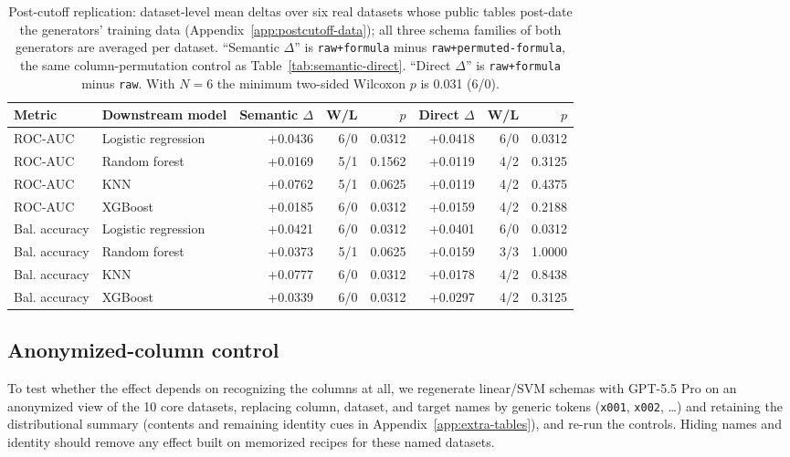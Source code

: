 \begin{table}[tbp]
\caption{Post-cutoff replication: dataset-level mean deltas over six real datasets whose public tables post-date the generators' training data (Appendix~\ref{app:postcutoff-data}); all three schema families of both generators are averaged per dataset. ``Semantic $\Delta$'' is \texttt{raw+formula} minus \texttt{raw+permuted-formula}, the same column-permutation control as Table~\ref{tab:semantic-direct}. ``Direct $\Delta$'' is \texttt{raw+formula} minus \texttt{raw}. With $N = 6$ the minimum two-sided Wilcoxon $p$ is 0.031 (6/0).}\label{tab:postcutoff}
\centering
\small
\begin{adjustbox}{max width=\linewidth}
\begin{tabular}{llrrrrrr}
\toprule
Metric & Downstream model & Semantic \(\Delta\) & W/L & \(p\) & Direct \(\Delta\) & W/L & \(p\) \\
\midrule
ROC-AUC & Logistic regression & +0.0436 & 6/0 & 0.0312 & +0.0418 & 6/0 & 0.0312 \\
ROC-AUC & Random forest & +0.0169 & 5/1 & 0.1562 & +0.0119 & 4/2 & 0.3125 \\
ROC-AUC & KNN & +0.0762 & 5/1 & 0.0625 & +0.0119 & 4/2 & 0.4375 \\
ROC-AUC & XGBoost & +0.0185 & 6/0 & 0.0312 & +0.0159 & 4/2 & 0.2188 \\
\midrule
Bal. accuracy & Logistic regression & +0.0421 & 6/0 & 0.0312 & +0.0401 & 6/0 & 0.0312 \\
Bal. accuracy & Random forest & +0.0373 & 5/1 & 0.0625 & +0.0159 & 3/3 & 1.0000 \\
Bal. accuracy & KNN & +0.0777 & 6/0 & 0.0312 & +0.0178 & 4/2 & 0.8438 \\
Bal. accuracy & XGBoost & +0.0339 & 6/0 & 0.0312 & +0.0297 & 4/2 & 0.3125 \\
\bottomrule
\end{tabular}
\end{adjustbox}
\end{table}

\subsection{Anonymized-column control}\label{sec:anon}

To test whether the effect depends on recognizing the columns at all, we regenerate linear/SVM schemas with GPT-5.5 Pro on an anonymized view of the 10 core datasets, replacing column, dataset, and target names by generic tokens (\texttt{x001}, \texttt{x002}, \ldots) and retaining the distributional summary (contents and remaining identity cues in Appendix~\ref{app:extra-tables}), and re-run the controls. Hiding names and identity should remove any effect built on memorized recipes for these named datasets.


